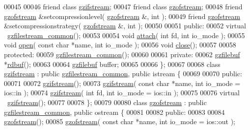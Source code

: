 \begin{DoxyCode}
00045 
00046   \textcolor{keyword}{friend} \textcolor{keyword}{class }\hyperlink{classgzifstream}{gzifstream};
00047   \textcolor{keyword}{friend} \textcolor{keyword}{class }\hyperlink{classgzofstream}{gzofstream};
00048   \textcolor{keyword}{friend} \hyperlink{classgzofstream}{gzofstream} &setcompressionlevel( \hyperlink{classgzofstream}{gzofstream} &, \textcolor{keywordtype}{int} );
00049   \textcolor{keyword}{friend} \hyperlink{classgzofstream}{gzofstream} &setcompressionstrategy( \hyperlink{classgzofstream}{gzofstream} &, \textcolor{keywordtype}{int} );
00050 
00051 \textcolor{keyword}{public}:
00052   \textcolor{keyword}{virtual} ~\hyperlink{classgzfilestream__common}{gzfilestream\_common}();
00053 
00054   \textcolor{keywordtype}{void} \hyperlink{classgzofstream_a95b76eaecd03b6cbf53d2f4b1c867439}{attach}( \textcolor{keywordtype}{int} fd, \textcolor{keywordtype}{int} io\_mode );
00055   \textcolor{keywordtype}{void} \hyperlink{classgzofstream_aee3eb31f07eda7f5ad1f60d59ea4b239}{open}( \textcolor{keyword}{const} \textcolor{keywordtype}{char} *name, \textcolor{keywordtype}{int} io\_mode );
00056   \textcolor{keywordtype}{void} \hyperlink{classgzofstream_a59e8b01e1c9741085f18ca456c4b8f54}{close}();
00057 
00058 \textcolor{keyword}{protected}:
00059   \hyperlink{classgzfilestream__common}{gzfilestream\_common}();
00060 
00061 \textcolor{keyword}{private}:
00062   \hyperlink{classgzfilebuf}{gzfilebuf} *\hyperlink{classgzofstream_a2fef74202b114357f41cfeb28f1d2acc}{rdbuf}();
00063 
00064   \hyperlink{classgzfilebuf}{gzfilebuf} buffer;
00065 
00066 \};
00067 
00068 \textcolor{keyword}{class }\hyperlink{classgzifstream}{gzifstream} : \textcolor{keyword}{public} \hyperlink{classgzfilestream__common}{gzfilestream\_common}, \textcolor{keyword}{public} istream \{
00069 
00070 \textcolor{keyword}{public}:
00071 
00072   \hyperlink{classgzifstream}{gzifstream}();
00073   \hyperlink{classgzifstream}{gzifstream}( \textcolor{keyword}{const} \textcolor{keywordtype}{char} *name, \textcolor{keywordtype}{int} io\_mode = ios::in );
00074   \hyperlink{classgzifstream}{gzifstream}( \textcolor{keywordtype}{int} fd, \textcolor{keywordtype}{int} io\_mode = ios::in );
00075 
00076   \textcolor{keyword}{virtual} ~\hyperlink{classgzifstream}{gzifstream}();
00077 
00078 \};
00079 
00080 \textcolor{keyword}{class }\hyperlink{classgzofstream}{gzofstream} : \textcolor{keyword}{public} \hyperlink{classgzfilestream__common}{gzfilestream\_common}, \textcolor{keyword}{public} ostream \{
00081 
00082 \textcolor{keyword}{public}:
00083 
00084   \hyperlink{classgzofstream}{gzofstream}();
00085   \hyperlink{classgzofstream}{gzofstream}( \textcolor{keyword}{const} \textcolor{keywordtype}{char} *name, \textcolor{keywordtype}{int} io\_mode = ios::out );

\end{DoxyCode}

